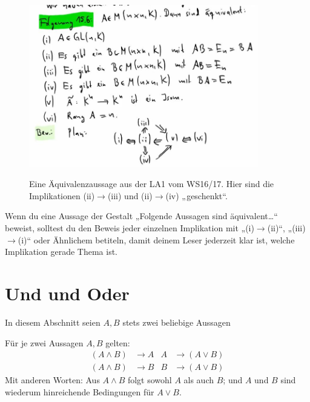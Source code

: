 \begin{bem}
\begin{figure}[H]
\begin{center}
\includegraphics[width=10cm]{./_img/equivbeweis.jpeg}
\label{zahlenkugel}
\end{center}
\centering \caption{Eine Äquivalenzaussage aus der LA1 vom WS16/17. Hier sind die Implikationen (ii)$\to$(iii) und (ii)$\to$(iv) „geschenkt“.}
\end{figure}
\end{bem}


\begin{bem}[Signalwörter]
Wenn du eine Aussage der Gestalt „Folgende Aussagen sind äquivalent\dots“ beweist, solltest du den Beweis jeder einzelnen Implikation mit „(i)$\to$(ii)“, „(iii)$\to$(i)“ oder Ähnlichem betiteln, damit deinem Leser jederzeit klar ist, welche Implikation gerade Thema ist.
\end{bem}














\section{Und und Oder}
In diesem Abschnitt seien $A,B$ stets zwei beliebige Aussagen

\begin{axi}\label{undoderaxiome}
 Für je zwei Aussagen $A,B$ gelten:
 \begin{align*}
  (A\land B) & \to A & A & \to (A\lor B) \\
  (A\land B) & \to B & B & \to (A\lor B)
 \end{align*}
Mit anderen Worten: Aus $A\land B$ folgt sowohl $A$ als auch $B$; und $A$ und $B$ sind wiederum hinreichende Bedingungen für $A\lor B$.
\end{axi}



